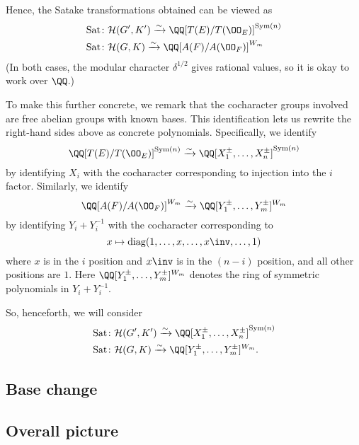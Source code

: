 Hence, the Satake transformations obtained can be viewed as
\begin{align*}
  \Sat &\colon \HH(G', K') \xrightarrow{\sim} \QQ[T(E) / T(\OO_E)]^{\Sym(n)} \\
  \Sat &\colon \HH(G, K)\xrightarrow{\sim} \QQ[A(F) / A(\OO_F)]^{W_m}
\end{align*}
(In both cases, the modular character $\delta^{1/2}$ gives rational values,
so it is okay to work over $\QQ$.)

To make this further concrete, we remark that the cocharacter groups
involved are free abelian groups with known bases.
This identification lets us rewrite the right-hand sides above as concrete polynomials.
Specifically, we identify
\[ \QQ[T(E) / T(\OO_E)]^{\Sym(n)}
  \xrightarrow{\sim} \QQ[X_1^\pm, \dots, X_n^\pm]^{\Sym(n)} \]
by identifying $X_i$ with the
cocharacter corresponding to injection into the $i$ factor.
Similarly, we identify
\[ \QQ[A(F) / A(\OO_F)]^{W_m}
  \xrightarrow{\sim} \QQ[Y_1^{\pm}, \dots, Y_m^{\pm}]^{W_m} \]
by identifying $Y_i + Y_i^{-1}$
with the cocharacter corresponding to
\[ x \mapsto \diag(1, \dots, x, \dots, x\inv, \dots, 1) \]
where $x$ is in the $i$ position and $x\inv$ is in the $(n-i)$ position,
and all other positions are $1$.
Here $\QQ[Y_1^{\pm}, \dots, Y_m^{\pm}]^{W_m}$
denotes the ring of symmetric polynomials in $Y_i + Y_i^{-1}$.

So, henceforth, we will consider
\begin{align*}
  \Sat &\colon \HH(G', K') \xrightarrow{\sim}\QQ[X_1^\pm, \dots, X_n^\pm]^{\Sym(n)} \\
  \Sat &\colon \HH(G, K)\xrightarrow{\sim} \QQ[Y_1^{\pm}, \dots, Y_m^{\pm}]^{W_m}.
\end{align*}

\subsection{Base change}

\subsection{Overall picture}
\begin{center}
\end{center}


